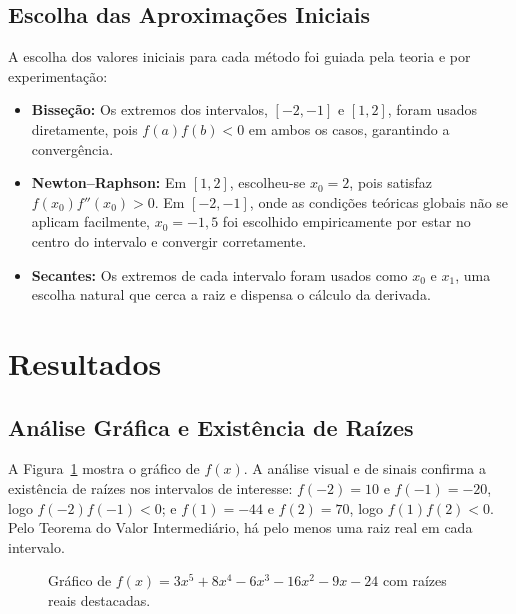 \documentclass[12pt,a4paper]{article}
\begin{document}
\subsection{Escolha das Aproximações Iniciais}
A escolha dos valores iniciais para cada método foi guiada pela teoria e por experimentação:
\begin{itemize}
    \item \textbf{Bisseção:} Os extremos dos intervalos, $[-2,-1]$ e $[1,2]$, foram usados diretamente, pois $f(a)f(b)<0$ em ambos os casos, garantindo a convergência.
    \item \textbf{Newton--Raphson:} Em $[1,2]$, escolheu-se $x_0=2$, pois satisfaz $f(x_0)f''(x_0)>0$. Em $[-2,-1]$, onde as condições teóricas globais não se aplicam facilmente, $x_0=-1,5$ foi escolhido empiricamente por estar no centro do intervalo e convergir corretamente.
    \item \textbf{Secantes:} Os extremos de cada intervalo foram usados como $x_0$ e $x_1$, uma escolha natural que cerca a raiz e dispensa o cálculo da derivada.
\end{itemize}

\section{Resultados}
\subsection{Análise Gráfica e Existência de Raízes}
A Figura~\ref{fig:grafico} mostra o gráfico de $f(x)$. A análise visual e de sinais confirma a existência de raízes nos intervalos de interesse: $f(-2)=10$ e $f(-1)=-20$, logo $f(-2)f(-1)<0$; e $f(1)=-44$ e $f(2)=70$, logo $f(1)f(2)<0$. Pelo Teorema do Valor Intermediário, há pelo menos uma raiz real em cada intervalo.

\begin{figure}[H]
\centering
{}
\caption{Gráfico de $f(x)=3x^{5}+8x^{4}-6x^{3}-16x^{2}-9x-24$ com raízes reais destacadas.}
\label{fig:grafico}
\end{figure}
\end{document}

